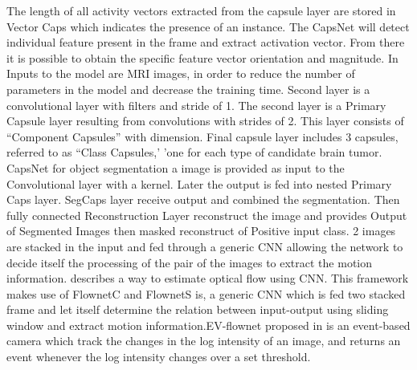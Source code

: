 \documentclass[11pt,english]{article}
\begin{document}
The length of all activity vectors extracted from the capsule layer are stored in Vector Caps which indicates the presence of an instance. The CapsNet will detect individual feature present in the frame and extract activation vector. From there it is possible to obtain the specific feature vector orientation and magnitude. In \citep{afshar2018brain} Inputs to the model are MRI images, in order to reduce the number of parameters in the model and decrease the training time. Second layer is a convolutional layer with filters and stride of 1. The second layer is a Primary Capsule layer resulting from convolutions with strides of 2. This layer consists of  “Component Capsules” with dimension. Final capsule layer includes 3 capsules, referred to as  “Class Capsules,’ ’one for each type of candidate brain tumor. CapsNet for object segmentation \citep{lalonde2018capsules} a image is provided as input to the Convolutional layer with a kernel. Later the output is fed into nested Primary Caps layer. SegCaps layer receive output and combined the segmentation. Then fully connected Reconstruction Layer reconstruct the image and provides Output of Segmented Images then masked reconstruct of Positive input class.
2 images are stacked\citep{dosovitskiy2015flownet} in the input and fed through a generic CNN allowing the network to decide itself the processing of the pair of the images to extract the motion information. \citep{ilg2017flownet} describes a way to estimate optical flow using CNN. This framework makes use of FlownetC and FlownetS  is, a generic CNN which is fed two stacked frame and let itself determine the relation between input-output using sliding window  and extract motion information.EV-flownet proposed in \citep{zhu2018ev} is an event-based camera which track the changes in the log intensity of an image, and returns an event whenever the log intensity changes over a set threshold.
\end{document}
